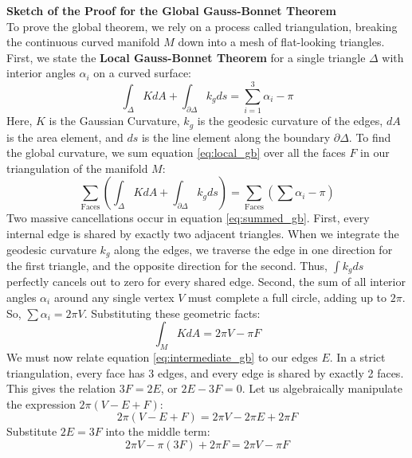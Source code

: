 \documentclass[11pt, a4paper]{report}
\begin{document}
\textbf{Sketch of the Proof for the Global Gauss-Bonnet Theorem} \\
To prove the global theorem, we rely on a process called triangulation, breaking the continuous curved manifold $M$ down into a mesh of flat-looking triangles.
First, we state the \textbf{Local Gauss-Bonnet Theorem} for a single triangle $\Delta$ with interior angles $\alpha_i$ on a curved surface:
\begin{equation} \int_{\Delta} K dA + \int_{\partial \Delta} k_g ds = \sum_{i=1}^3 \alpha_i - \pi \label{eq:local_gb} \end{equation}
Here, $K$ is the Gaussian Curvature, $k_g$ is the geodesic curvature of the edges, $dA$ is the area element, and $ds$ is the line element along the boundary $\partial \Delta$.
To find the global curvature, we sum equation \eqref{eq:local_gb} over all the faces $F$ in our triangulation of the manifold $M$:
\begin{equation} \sum_{\text{Faces}} \left( \int_{\Delta} K dA + \int_{\partial \Delta} k_g ds \right) = \sum_{\text{Faces}} \left( \sum \alpha_i - \pi \right) \label{eq:summed_gb} \end{equation}
Two massive cancellations occur in equation \eqref{eq:summed_gb}. First, every internal edge is shared by exactly two adjacent triangles. When we integrate the geodesic curvature $k_g$ along the edges, we traverse the edge in one direction for the first triangle, and the opposite direction for the second. Thus, $\int k_g ds$ perfectly cancels out to zero for every shared edge. Second, the sum of all interior angles $\alpha_i$ around any single vertex $V$ must complete a full circle, adding up to $2\pi$. So, $\sum \alpha_i = 2\pi V$. Substituting these geometric facts:
\begin{equation} \int_M K dA = 2\pi V - \pi F \label{eq:intermediate_gb} \end{equation}
We must now relate equation \eqref{eq:intermediate_gb} to our edges $E$. In a strict triangulation, every face has 3 edges, and every edge is shared by exactly 2 faces. This gives the relation $3F = 2E$, or $2E - 3F = 0$.
Let us algebraically manipulate the expression $2\pi(V - E + F)$:
\begin{equation} 2\pi(V - E + F) = 2\pi V - 2\pi E + 2\pi F \end{equation}
Substitute $2E = 3F$ into the middle term:
\begin{equation} 2\pi V - \pi(3F) + 2\pi F = 2\pi V - \pi F \label{eq:algebra_trick} \end{equation}
\end{document}
